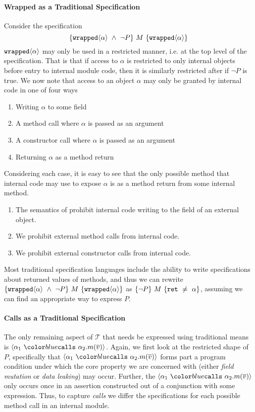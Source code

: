 \paragraph{Wrapped as a Traditional Specification}
Consider the specification 
$$\{\texttt{wrapped}\langle \alpha \rangle\ \wedge\ \neg P\}\ M\ \{\texttt{wrapped}\langle \alpha \rangle\}$$
$\texttt{wrapped}\langle \alpha \rangle$ may only be used in a restricted manner, i.e. at the top 
level of the specification. That is that if access to $\alpha$ is restricted 
to only internal objects before entry to internal module code, 
then it is similarly restricted after if $\neg P$ is true. We now note that 
access to an object $\alpha$ may only be granted by internal code in one of four ways
\begin{enumerate}
\item
Writing $\alpha$ to some field
\item
A method call where $\alpha$ is passed as an argument
\item
A constructor call where $\alpha$ is passed as an argument
\item
Returning $\alpha$ as a method return
\end{enumerate}
Considering each case, 
it is easy to see that the only possible method that 
internal code may use to expose $\alpha$ is as a method
return from some internal method.
\begin{enumerate}
\item
The semantics of \Loo prohibit internal code 
writing to the field of an external object.
\item
We prohibit external method calls from internal code.
\item
We prohibit external constructor calls from internal code.
\end{enumerate}
Most traditional specification languages include the ability 
to write specifications about returned values of methods, and 
thus we can rewrite $\{\texttt{wrapped}\langle \alpha \rangle\ \wedge\ \neg P\}\ M\ \{\texttt{wrapped}\langle \alpha \rangle\}$
as $\hoare{\neg P}{M}{\texttt{ret}\ \neq\ \alpha}$, assuming we can find an appropriate 
way to express $P$.


\paragraph{Calls as a Traditional Specification}
The only remaining aspect of $\mathcal{T}$ that needs be
expressed using traditional means is $\calls{\alpha_1}{\alpha_2}{m}{\overline{v}}$.
Again, we first look at the restricted shape of $P$, specifically that
$\calls{\alpha_1}{\alpha_2}{m}{\overline{v}}$ forms part a program condition
under which the core property we are concerned with 
(either \emph{field mutation} or \emph{data leaking})
may occur. Further, the $\calls{\alpha_1}{\alpha_2}{m}{\overline{v}}$
only occurs once in an assertion constructed out of a
conjunction with some expression. Thus, to capture \emph{calls}
we differ the specifications for each possible method call in an
internal module. 

